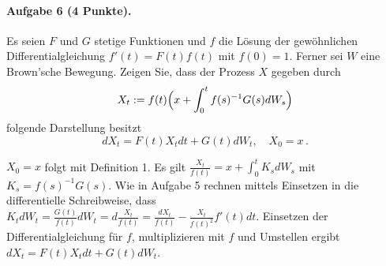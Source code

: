\documentclass{article}
\begin{document}
\paragraph{Aufgabe 6 \textnormal{(4 Punkte)}.}
Es seien $F$ und $G$ stetige Funktionen und $f$ die Lösung der gewöhnlichen Differentialgleichung $f'(t)=F(t)f(t)$ mit $f(0)=1$.
Ferner sei $W$ eine Brown'sche Bewegung.
Zeigen Sie, dass der Prozess $X$ gegeben durch
\[
X_t:=f(t)\Bigl(x+\int_0^t f(s)^{-1}G(s)dW_s\Bigr)
\]
folgende Darstellung besitzt
\[
dX_t=F(t)X_tdt+G(t)dW_t,\quad X_0=x\,.
\]

$X_0=x$ folgt mit Definition 1.
Es gilt $\frac{X_t}{f(t)}=x+\int_0^tK_sdW_s$ mit $K_s=f(s)^{-1}G(s)$.
Wie in Aufgabe 5 rechnen mittels Einsetzen in die differentielle Schreibweise, dass
  $K_tdW_t
  =\frac{G(t)}{f(t)}dW_t
  =d\frac{X_t}{f(t)}
  =\frac{dX_t}{f(t)}-\frac{X_t}{f(t)^2}f'(t)dt$.
Einsetzen der Differentialgleichung für $f$, multiplizieren mit $f$ und Umstellen ergibt $dX_t=F(t)X_tdt+G(t)dW_t$.

\end{document}
